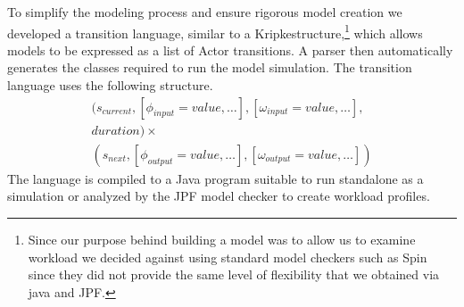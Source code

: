 To simplify the modeling process and ensure rigorous model creation we
developed a transition language, similar to a Kripkestructure,\footnote{Since our purpose behind building a model was to allow us to examine workload we decided against using standard model checkers such as Spin since they did not provide the same level of flexibility that we obtained via java and JPF.}  which allows
models to be expressed as a list of Actor transitions.  A parser then
automatically generates the classes required to run the model simulation.
The transition language uses the following structure.
\begin{equation}
\begin{split}
(s_{current}, [\phi_{input} = value,\ldots], [\omega_{input} = value,\ldots],\\
duration) \times \\
(s_{next}, [\phi_{output} =
value,\ldots], [\omega_{output} = value,\ldots])
\end{split}
\end{equation}
\noindent The language is compiled to a Java program suitable to run standalone
as a simulation or analyzed by the JPF model checker to create
workload profiles.

